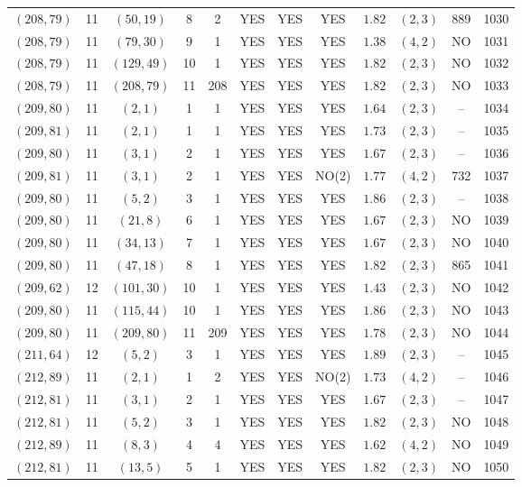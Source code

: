 \begin{longtable}{|c|c|c|c|c|c|c|c|c|c|c|c|}
$(208,79)$ & 11 & $(50,19)$ & 8 & 2 & YES & YES & YES & $1.82$ & $(2,3)$ & 889 & 1030\\
$(208,79)$ & 11 & $(79,30)$ & 9 & 1 & YES & YES & YES & $1.38$ & $(4,2)$ & NO & 1031\\
$(208,79)$ & 11 & $(129,49)$ & 10 & 1 & YES & YES & YES & $1.82$ & $(2,3)$ & NO & 1032\\
$(208,79)$ & 11 & $(208,79)$ & 11 & 208 & YES & YES & YES & $1.82$ & $(2,3)$ & NO & 1033\\
$(209,80)$ & 11 & $(2,1)$ & 1 & 1 & YES & YES & YES & $1.64$ & $(2,3)$ & -- & 1034\\
$(209,81)$ & 11 & $(2,1)$ & 1 & 1 & YES & YES & YES & $1.73$ & $(2,3)$ & -- & 1035\\
$(209,80)$ & 11 & $(3,1)$ & 2 & 1 & YES & YES & YES & $1.67$ & $(2,3)$ & -- & 1036\\
$(209,81)$ & 11 & $(3,1)$ & 2 & 1 & YES & YES & NO(2) & $1.77$ & $(4,2)$ & 732 & 1037\\
$(209,80)$ & 11 & $(5,2)$ & 3 & 1 & YES & YES & YES & $1.86$ & $(2,3)$ & -- & 1038\\
$(209,80)$ & 11 & $(21,8)$ & 6 & 1 & YES & YES & YES & $1.67$ & $(2,3)$ & NO & 1039\\
$(209,80)$ & 11 & $(34,13)$ & 7 & 1 & YES & YES & YES & $1.67$ & $(2,3)$ & NO & 1040\\
$(209,80)$ & 11 & $(47,18)$ & 8 & 1 & YES & YES & YES & $1.82$ & $(2,3)$ & 865 & 1041\\
$(209,62)$ & 12 & $(101,30)$ & 10 & 1 & YES & YES & YES & $1.43$ & $(2,3)$ & NO & 1042\\
$(209,80)$ & 11 & $(115,44)$ & 10 & 1 & YES & YES & YES & $1.86$ & $(2,3)$ & NO & 1043\\
$(209,80)$ & 11 & $(209,80)$ & 11 & 209 & YES & YES & YES & $1.78$ & $(2,3)$ & NO & 1044\\
$(211,64)$ & 12 & $(5,2)$ & 3 & 1 & YES & YES & YES & $1.89$ & $(2,3)$ & -- & 1045\\
$(212,89)$ & 11 & $(2,1)$ & 1 & 2 & YES & YES & NO(2) & $1.73$ & $(4,2)$ & -- & 1046\\
$(212,81)$ & 11 & $(3,1)$ & 2 & 1 & YES & YES & YES & $1.67$ & $(2,3)$ & -- & 1047\\
$(212,81)$ & 11 & $(5,2)$ & 3 & 1 & YES & YES & YES & $1.82$ & $(2,3)$ & NO & 1048\\
$(212,89)$ & 11 & $(8,3)$ & 4 & 4 & YES & YES & YES & $1.62$ & $(4,2)$ & NO & 1049\\
$(212,81)$ & 11 & $(13,5)$ & 5 & 1 & YES & YES & YES & $1.82$ & $(2,3)$ & NO & 1050\\

\end{longtable}
